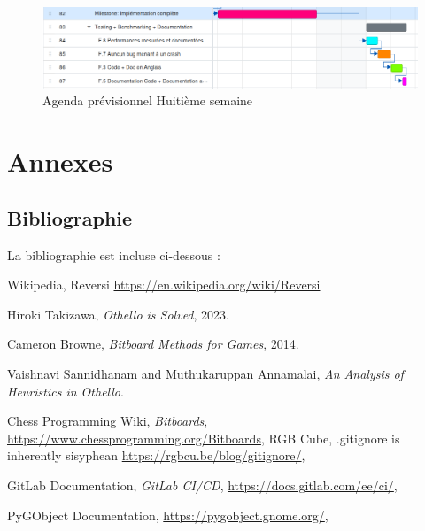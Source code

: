 \documentclass[a4paper,12pt]{article}
\begin{document}
\begin{figure}[H]
  \centering
  \includegraphics[width=18cm]{images/Semaine8.png}
  \caption{Agenda prévisionnel Huitième semaine}
\end{figure}

\newpage
\section*{Annexes}

\subsection*{Bibliographie}
La bibliographie est incluse ci-dessous :

\begin{thebibliography}{10}

  Wikipedia, Reversi
  \url{https://en.wikipedia.org/wiki/Reversi}

  Hiroki Takizawa,
  \emph{Othello is Solved},
  2023.

  Cameron Browne,
  \emph{Bitboard Methods for Games},
  2014.

  Vaishnavi Sannidhanam and Muthukaruppan Annamalai,
  \emph{An Analysis of Heuristics in Othello}.

  Chess Programming Wiki,
  \emph{Bitboards},
  \url{https://www.chessprogramming.org/Bitboards},
  RGB Cube, .gitignore is inherently sisyphean
  \url{https://rgbcu.be/blog/gitignore/},

  GitLab Documentation,
  \emph{GitLab CI/CD},
  \url{https://docs.gitlab.com/ee/ci/},

  PyGObject Documentation,
  \url{https://pygobject.gnome.org/},

\end{thebibliography}
\end{document}
